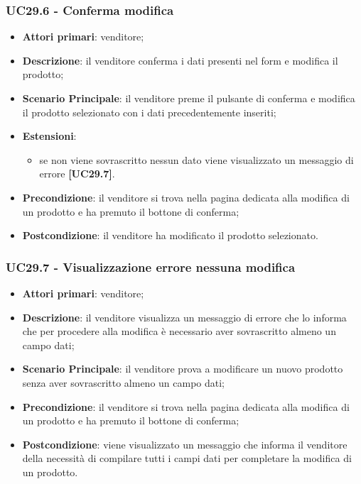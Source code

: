 \subsubsection{UC29.6 - Conferma modifica}
\begin{itemize}
\item \textbf{Attori primari}: venditore;
\item \textbf{Descrizione}: il venditore conferma i dati presenti nel form e modifica il prodotto;
\item \textbf{Scenario Principale}: il venditore preme il pulsante di conferma e modifica il prodotto selezionato con i dati precedentemente inseriti;
\item \textbf{Estensioni}: 
\begin{itemize}
	\item se non viene sovrascritto nessun dato viene visualizzato un messaggio di errore \textbf{[UC29.7]}.
\end{itemize} 
\item \textbf{Precondizione}: il venditore si trova nella pagina dedicata alla modifica di un prodotto e ha premuto il bottone di conferma;
\item \textbf{Postcondizione}: il venditore ha modificato il prodotto selezionato.
\end{itemize}

\subsubsection{UC29.7 - Visualizzazione errore nessuna modifica}
\begin{itemize}
\item \textbf{Attori primari}: venditore;
\item \textbf{Descrizione}: il venditore visualizza un messaggio di errore che lo informa che per procedere alla modifica è necessario aver sovrascritto almeno un campo dati;
\item \textbf{Scenario Principale}: il venditore prova a modificare un nuovo prodotto senza aver sovrascritto almeno un campo dati;
\item \textbf{Precondizione}: il venditore si trova nella pagina dedicata alla modifica di un prodotto e ha premuto il bottone di conferma;
\item \textbf{Postcondizione}: viene visualizzato un messaggio che informa il venditore della necessità di compilare tutti i campi dati per completare la modifica di un prodotto.
\end{itemize}


